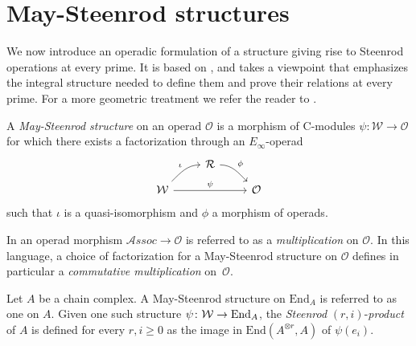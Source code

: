 
\section{May-Steenrod structures} \label{s:steenrod}

We now introduce an operadic formulation of a structure giving rise to Steenrod operations at every prime. It is based on \cites{steenrod47products, steenrod53symmetric, steenrod53cyclic, may70generalapproach}, and takes a viewpoint that emphasizes the integral structure needed to define them and prove their relations at every prime. For a more geometric treatment we refer the reader to \cites{may72geometry, may76homology, lawson2020n}.

\begin{definition} \label{def: May-Steenrod structure}
	A \textit{May-Steenrod structure} on an operad $\mathcal O$ is a 
	morphism of $\mathrm{C}$-modules $\psi \colon \mathcal W \to \mathcal O$ for which there exists a factorization through an $E_\infty$-operad
	\begin{equation*}
	\begin{tikzcd}[column sep = normal, row sep = small]
	& \mathcal R \arrow[dr, "\phi", out=0] & \\
	\mathcal W \arrow[ur, "\iota", in=180] \arrow[rr, "\psi"] & & \mathcal O
	\end{tikzcd}
	\end{equation*}
	such that $\iota$ is a quasi-isomorphism and $\phi$ a morphism of operads.
\end{definition}

\begin{remark} \label{rmk: Deligne conjecture}
	In \cite{GerstenhaberVoronov} an operad morphism $\mathcal{A}ssoc \to \mathcal O$ is referred to as a \textit{multiplication} on $\mathcal O$. In this language, a choice of factorization for a May-Steenrod structure on $\mathcal O$ defines in particular a \textit{commutative multiplication} on~$\mathcal O$.
\end{remark}

\begin{definition} \label{def: Steenrod products}
	Let $A$ be a chain complex.
	A May-Steenrod structure on $\mathrm{End}_A$ is referred to as one on $A$.
	Given one such structure $\psi \colon \mathcal W \to \mathrm{End}_A$, the \textit{Steenrod} $(r, i)$-\textit{product} of $A$ is defined for every $r, i \geq 0$ as the image in $ \mathrm{End}(A^{\otimes r}, A)$ of $\psi(e_i)$.
\end{definition}

